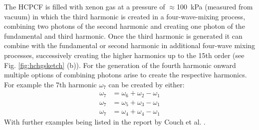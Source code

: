 The HCPCF is filled with xenon gas at a pressure of $\approx$\qty{100}{\kilo\pascal} (measured from vacuum) in which the third harmonic is created in a four-wave-mixing process, combining two photons of the second harmonic and creating one photon of the fundamental and third harmonic.
Once the third harmonic is generated it can combine with the fundamental or second harmonic in additional four-wave mixing processes, successively creating the higher harmonics up to the 15th order (see Fig. \ref{fig:hchgsketch} (b)).
For the generation of the fourth harmonic onward multiple options of combining photons arise to create the respective harmonics.
For example the 7th harmonic $\omega_7$ can be created by either:
\begin{equation}
\begin{aligned}
	\omega_7 &= \omega_6 + \omega_2 - \omega_1 \\
	\omega_7 &= \omega_5 + \omega_3 - \omega_1 \\
	\omega_7 &= \omega_4 + \omega_4 - \omega_1
\end{aligned}
\label{eq:vuv_pathway}
\end{equation}
With further examples being listed in the report by Couch et al. \cite{couch_ultrafast_2020}.


